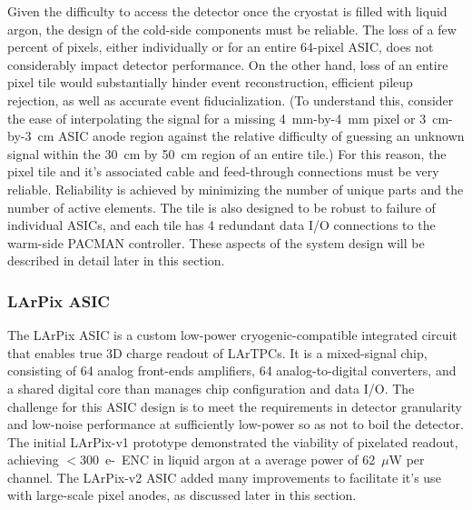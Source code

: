 Given the difficulty to access the detector once the cryostat is filled with liquid argon, the design of the cold-side components must be reliable.
The loss of a few percent of pixels, either individually or for an entire 64-pixel ASIC, does not considerably impact detector performance.
On the other hand, loss of an entire pixel tile would substantially hinder event reconstruction, efficient pileup rejection, as well as accurate event fiducialization.
(To understand this, consider the ease of interpolating the signal for a missing 4~mm-by-4~mm pixel or 3~cm-by-3~cm ASIC anode region against the relative difficulty of guessing an unknown signal within the 30~cm by 50~cm region of an entire tile.) 
For this reason, the pixel tile and it's associated cable and feed-through connections must be very reliable.
Reliability is achieved by minimizing the number of unique parts and the number of active elements.
The tile is also designed to be robust to failure of individual ASICs, and each tile has 4 redundant data I/O connections to the warm-side PACMAN controller. 
These aspects of the system design will be described in detail later in this section.

\subsubsection{LArPix ASIC}
\label{sec:larpix-asic}

The LArPix ASIC is a custom low-power cryogenic-compatible integrated circuit that enables true 3D charge readout of LArTPCs\@.
It is a mixed-signal chip, consisting of 64 analog front-ends amplifiers, 64 analog-to-digital converters, and a shared digital core than manages chip configuration and data I/O\@.
The challenge for this ASIC design is to meet the requirements in detector granularity and low-noise performance at sufficiently low-power so as not to boil the detector.
The initial LArPix-v1 prototype demonstrated the viability of pixelated readout, achieving $<$300~e-~ENC in liquid argon at a average power of 62~$\mu$W per channel.
The LArPix-v2 ASIC added many improvements to facilitate it's use with large-scale pixel anodes, as discussed later in this section.

